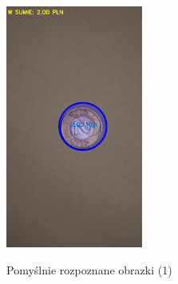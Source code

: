 \documentclass{mwart}
\begin{document}
\begin{figure}[H]
\begin{center}
{            \includegraphics[width=0.4\textwidth]{good_004.jpg}
        }
    \end{center}
    \caption{Pomyślnie rozpoznane obrazki (1)}
   \label{fig:subfigures}
\end{figure}
\end{document}
